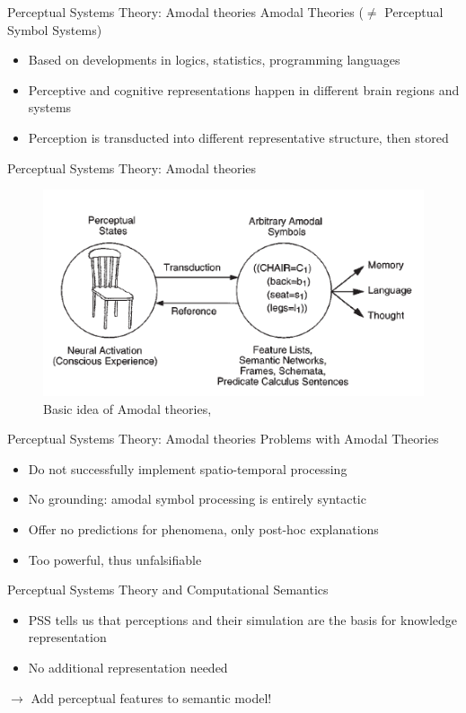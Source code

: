 \documentclass[12pt,a4paper]{beamer}
\begin{document}
\begin{frame}{Perceptual Systems Theory: Amodal theories }
Amodal Theories ($\neq$ Perceptual Symbol Systems)
\begin{itemize}
\item Based on developments in logics, statistics, programming languages
\item Perceptive and cognitive representations happen in different brain regions and systems
\item Perception is transducted into different representative structure, then stored
\end{itemize}
\end{frame}

\begin{frame}{Perceptual Systems Theory: Amodal theories}
\begin{figure}
\includegraphics[scale=0.8]{barsalou_figure_2_amodal_symbol_systems.png}
\caption{Basic idea of Amodal theories, \cite{barsalou}}
\end{figure}
\end{frame}

\begin{frame}{Perceptual Systems Theory: Amodal theories}
Problems with Amodal Theories
\begin{itemize}
\item Do not successfully implement spatio-temporal processing
\item No grounding: amodal symbol processing is entirely syntactic
\item Offer no predictions for phenomena, only post-hoc explanations
\item Too powerful, thus unfalsifiable
\end{itemize}
\end{frame}


\begin{frame}{Perceptual Systems Theory and Computational Semantics}
\begin{itemize}
\item PSS tells us that perceptions and their simulation are the basis for knowledge representation
\item No additional representation needed
\end{itemize}
$\to$ Add perceptual features to semantic model!
\end{frame}
\end{document}
